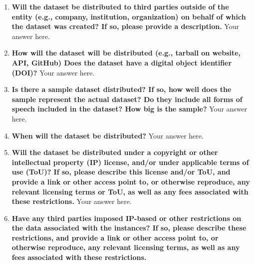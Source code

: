 \documentclass{article}
\begin{document}
    \noindent{}
    \begin{enumerate}[leftmargin=0.65cm]
        \scriptsize
        \item \textbf{Will the dataset be distributed to third parties outside of the entity (e.g., company, institution, organization) on behalf of which the dataset was created? If so, please provide a description.}
        \newline 
        Your answer here.
        \newline 
        \item \textbf{How will the dataset will be distributed (e.g., tarball on website, API, GitHub) Does the dataset have a digital object identifier (DOI)?}
        \newline 
        Your answer here.
        \newline 
        \item \textbf{Is there a sample dataset distributed? If so, how well does the sample represent the actual dataset? Do they include all forms of speech included in the dataset? How big is the sample?}
        \newline 
        Your answer here.
        \newline 
        \item \textbf{When will the dataset be distributed?}
        \newline 
        Your answer here.
        \newline 
        \item \textbf{Will the dataset be distributed under a copyright or other intellectual property (IP) license, and/or under applicable terms of use (ToU)? If so, please describe this license and/or ToU, and provide a link or other access point to, or otherwise reproduce, any relevant licensing terms or ToU, as well as any fees associated with these restrictions.}
        \newline 
        Your answer here.
        \newline 
        \item \textbf{Have any third parties imposed IP-based or other restrictions on the data associated with the instances? If so, please describe these restrictions, and provide a link or other access point to, or otherwise reproduce, any relevant licensing terms, as well as any fees associated with these restrictions.}

\end{enumerate}
\end{document}
